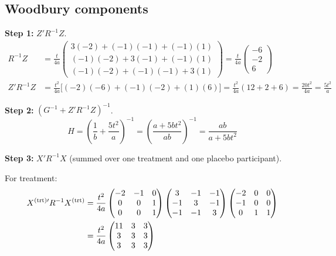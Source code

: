 \documentclass[11pt]{article}
\begin{document}
\subsection{Woodbury components}

\textbf{Step 1:} $Z'R^{-1}Z$.
\begin{align}
  R^{-1}Z &= \frac{t}{4a}\begin{pmatrix}
    3(-2) + (-1)(-1) + (-1)(1) \\
    (-1)(-2) + 3(-1) + (-1)(1) \\
    (-1)(-2) + (-1)(-1) + 3(1)
  \end{pmatrix}
  = \frac{t}{4a}\begin{pmatrix} -6 \\ -2 \\ 6 \end{pmatrix}
  \\[6pt]
  Z'R^{-1}Z &= \frac{t^2}{4a}\bigl[
    (-2)(-6) + (-1)(-2) + (1)(6)\bigr]
  = \frac{t^2}{4a}(12 + 2 + 6)
  = \frac{20t^2}{4a}
  = \frac{5t^2}{a}
\end{align}

\textbf{Step 2:} $(G^{-1} + Z'R^{-1}Z)^{-1}$.
\begin{equation}
  H = \left(\frac{1}{b} + \frac{5t^2}{a}\right)^{-1}
  = \left(\frac{a + 5bt^2}{ab}\right)^{-1}
  = \frac{ab}{a + 5bt^2}
\end{equation}

\textbf{Step 3:} $X'R^{-1}X$ (summed over one treatment
and one placebo participant).

For treatment:
\begin{align}
  X^{(\text{trt})\prime} R^{-1} X^{(\text{trt})}
  &= \frac{t^2}{4a}
    \begin{pmatrix} -2&-1&0 \\ 0&0&1 \\ 0&0&1 \end{pmatrix}
    \begin{pmatrix} 3&-1&-1 \\ -1&3&-1 \\ -1&-1&3 \end{pmatrix}
    \begin{pmatrix} -2&0&0 \\ -1&0&0 \\ 0&1&1 \end{pmatrix}
  \notag \\
  &= \frac{t^2}{4a}\begin{pmatrix}
    11 & 3 & 3 \\ 3 & 3 & 3 \\ 3 & 3 & 3
  \end{pmatrix}
\end{align}
\end{document}
